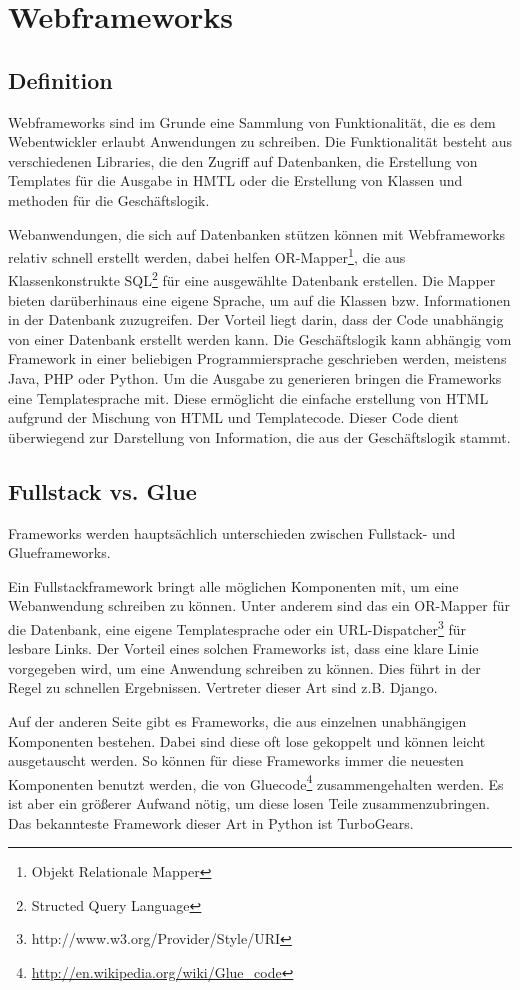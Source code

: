 \chapter{Webframeworks}
\section{Definition}
Webframeworks sind im Grunde eine Sammlung von Funktionalität, die es dem
Webentwickler erlaubt Anwendungen zu schreiben. Die Funktionalität besteht aus
verschiedenen Libraries, die den Zugriff auf Datenbanken, die Erstellung von
Templates für die Ausgabe in HMTL oder die Erstellung von Klassen und methoden
für die Geschäftslogik. 

Webanwendungen, die sich auf Datenbanken stützen können mit Webframeworks
relativ schnell erstellt werden, dabei helfen OR-Mapper\footnote{Objekt
Relationale Mapper}, die aus Klassenkonstrukte SQL\footnote{Structed Query
Language} für eine ausgewählte Datenbank erstellen. Die Mapper bieten
darüberhinaus eine eigene Sprache, um auf die Klassen bzw. Informationen in der
Datenbank zuzugreifen. Der Vorteil liegt darin, dass der Code unabhängig von
einer Datenbank erstellt werden kann. Die Geschäftslogik kann abhängig vom
Framework in einer beliebigen Programmiersprache geschrieben werden, meistens
Java, PHP oder Python. Um die Ausgabe zu generieren bringen die Frameworks eine
Templatesprache mit. Diese ermöglicht die einfache erstellung von HTML aufgrund
der Mischung von HTML und Templatecode. Dieser Code dient überwiegend zur
Darstellung von Information, die aus der Geschäftslogik stammt. 

\section{Fullstack vs. Glue}
Frameworks werden hauptsächlich unterschieden zwischen Fullstack- und
Glueframeworks.

Ein Fullstackframework bringt alle möglichen Komponenten mit,
um eine Webanwendung schreiben zu können. Unter anderem sind das ein OR-Mapper
für die Datenbank, eine eigene Templatesprache oder ein
URL-Dispatcher\footnote{http://www.w3.org/Provider/Style/URI} für lesbare
Links. Der Vorteil eines solchen Frameworks ist, dass eine klare Linie 
vorgegeben wird, um eine Anwendung schreiben zu können. Dies führt in der Regel
zu schnellen Ergebnissen. Vertreter dieser Art sind z.B. Django.

Auf der anderen Seite gibt es Frameworks, die aus einzelnen
unabhängigen Komponenten bestehen. Dabei sind diese oft lose gekoppelt und
können leicht ausgetauscht werden. So können für diese Frameworks immer die 
neuesten Komponenten benutzt werden, die von
Gluecode\footnote{\url{http://en.wikipedia.org/wiki/Glue_code}} zusammengehalten
werden. Es ist aber ein größerer Aufwand nötig, um diese losen Teile 
zusammenzubringen. Das bekannteste Framework dieser Art in Python ist TurboGears.
